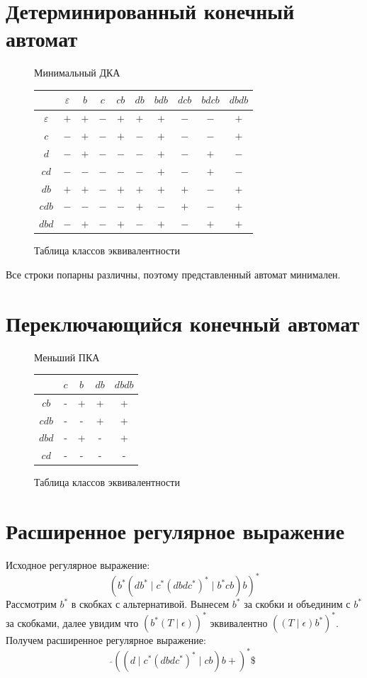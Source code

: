 \documentclass[a4paper, 14pt]{extarticle}
\begin{document}
\section{Детерминированный конечный автомат}
\begin{figure}[H]
\centering
\scalebox{1.2}{}
\caption{Минимальный ДКА}
\end{figure}
\begin{figure}[H]
\centering
\begin{tabular}{|c|c|c|c|c|c|c|c|c|c|}
\hline
 & $\varepsilon$ & $b$ & $c$ & $cb$ & $db$ & $bdb$ & $dcb$ & $bdcb$ & $dbdb$ \\
\hline
$\varepsilon$ & $+$ & $+$ & $-$ & $+$ & $+$ & $+$ & $-$ & $-$ & $+$ \\
\hline
$c$ & $-$ & $+$ & $-$ & $+$ & $-$ & $+$ & $-$ & $-$ & $+$ \\
\hline
$d$ & $-$ & $+$ & $-$ & $-$ & $-$ & $+$ & $-$ & $+$ & $-$ \\
\hline
$cd$ & $-$ & $-$ & $-$ & $-$ & $-$ & $+$ & $-$ & $+$ & $-$ \\
\hline
$db$ & $+$ & $+$ & $-$ & $+$ & $+$ & $+$ & $+$ & $-$ & $+$ \\
\hline
$cdb$ & $-$ & $-$ & $-$ & $-$ & $+$ & $-$ & $+$ & $-$ & $+$ \\
\hline
$dbd$ & $-$ & $+$ & $-$ & $+$ & $-$ & $+$ & $-$ & $+$ & $+$ \\
\hline
\end{tabular}
\caption{Таблица классов эквивалентности}
\end{figure}
Все строки попарны различны, поэтому представленный автомат минимален.

\section{Переключающийся конечный автомат}
\begin{figure}[H]
\centering

\caption{Меньший ПКА}
\end{figure}
\begin{figure}[H]
\centering
\begin{tabular}{|c|c|c|c|c|}
\hline
 & $c$ & $b$ & $db$ & $dbdb$\\
\hline
$cb$       & - & + & + & + \\
\hline
$cdb$         & - & - & + & + \\
\hline
$dbd$        & - & + & - & + \\
\hline
$cd$       & - & - & - & - \\
\hline
\end{tabular}
\caption{Таблица классов эквивалентности}
\end{figure}
\section{Расширенное регулярное выражение}
Исходное регулярное выражение: \[(b^{*}(db^{*}\mid c^{*}(dbdc^{*})^{*}\mid b^{*}cb)b)^{*}\]
Рассмотрим $b^{*}$ в скобках с альтернативой. Вынесем $b^{*}$ за скобки и объединим с $b^{*}$ за скобками, далее увидим что $(b^{*}(T\mid \epsilon))^{*}$ эквивалентно $((T\mid \epsilon)b^{*})^{*}$. Получем расширенное регулярное выражение:
\[\hat{}((d\mid c^{*}(dbdc^{*})^{*}\mid cb)b+)^*\$\]
\end{document}
